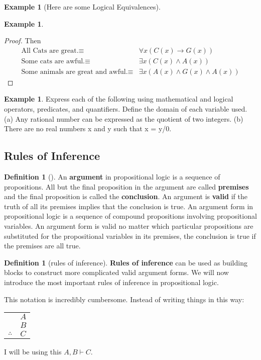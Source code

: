 \documentclass[letterpaper,10pt]{article}
\theoremstyle{plain}
\theoremstyle{definition}
\newtheorem{defn}[thm]{Definition}
\newtheorem{exmp}[thm]{Example}
\theoremstyle{remark}
\providecommand{\land}{\ensuremath{\wedge}}
\begin{document}
\begin{exmp}[Here are some Logical Equivalences]
\begin{exmp}
\begin{enumerate}
\begin{proof}
Then
\begin{align}
\text{All Cats are great.}\equiv& \forall x (C(x)\to G(x))\\
\text{Some cats are awful.}\equiv& \exists x (C(x)\land A(x))\\
\text{Some animals are great and awful.}\equiv& \exists x (A(x) \land G(x) \land A(x))
\end{align}


\end{proof}
    
  \end{enumerate}


\end{exmp}

\begin{exmp}
Express each of the following using mathematical and logical operators,
predicates, and quantifiers. Define the domain of each variable used.
(a) Any rational number can be expressed as the quotient of two integers.
(b) There are no real numbers x and y such that x = y/0.

\end{exmp}
\vspace{3cm}

\newpage
\subsection{Rules of Inference}
\begin{defn}[]
An \textbf{argument} in propositional logic is a sequence of propositions. All but the final proposition
in the argument are called \textbf{premises} and the final proposition is called the \textbf{conclusion}. An
argument is \textbf{valid} if the truth of all its premises implies that the conclusion is true.
An argument form in propositional logic is a sequence of compound propositions involving
propositional variables. An argument form is valid no matter which particular propositions
are substituted for the propositional variables in its premises, the conclusion is true if
the premises are all true.
\end{defn}
\begin{defn}[rules of inference]
\textbf{Rules of inference} can be used as building blocks to construct more complicated valid argument forms.
We will now introduce the most important rules of inference in propositional logic.
\end{defn}
This notation is incredibly cumbersome. Instead of writing things in this way:
\begin{tabular}{cl}
    & $A$\\
    & $B$\\
    \hline
    $\therefore$ & $C$
  \end{tabular}
I will be using this
$A,B \vdash C$.


\end{exmp}
\end{document}
